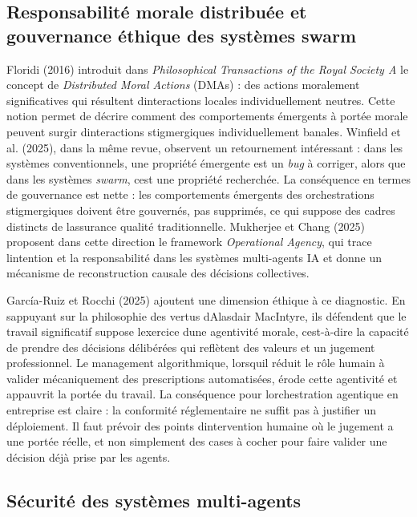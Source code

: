 \subsection{Responsabilit\'e morale distribu\'ee et gouvernance \'ethique des syst\`emes swarm}

Floridi (2016) introduit dans \emph{Philosophical Transactions of the
Royal Society A} le concept de \emph{Distributed Moral Actions} (DMAs) :
des actions moralement significatives qui résultent
d\textquotesingle interactions locales individuellement neutres. Cette
notion permet de décrire comment des comportements émergents à portée
morale peuvent surgir d\textquotesingle interactions stigmergiques
individuellement banales. Winfield et al. (2025), dans la même revue,
observent un retournement intéressant : dans les systèmes
conventionnels, une propriété émergente est un \emph{bug} à corriger,
alors que dans les systèmes \emph{swarm}, c\textquotesingle est une
propriété recherchée. La conséquence en termes de gouvernance est nette :
les comportements émergents des orchestrations stigmergiques doivent
être gouvernés, pas supprimés, ce qui suppose des cadres distincts de
l\textquotesingle assurance qualité traditionnelle. Mukherjee et Chang
(2025) proposent dans cette direction le framework
\emph{Operational Agency}, qui trace l\textquotesingle intention et la
responsabilité dans les systèmes multi-agents IA et donne un mécanisme
de reconstruction causale des décisions collectives.

García-Ruiz et Rocchi (2025) ajoutent une dimension éthique à ce
diagnostic. En s\textquotesingle appuyant sur la philosophie des vertus
d\textquotesingle Alasdair MacIntyre, ils défendent que le travail
significatif suppose l\textquotesingle exercice d\textquotesingle une
agentivité morale, c\textquotesingle est-à-dire la capacité de prendre
des décisions délibérées qui reflètent des valeurs et un jugement
professionnel. Le management algorithmique, lorsqu\textquotesingle il
réduit le rôle humain à valider mécaniquement des prescriptions
automatisées, érode cette agentivité et appauvrit la portée du travail.
La conséquence pour l\textquotesingle orchestration agentique en
entreprise est claire : la conformité réglementaire ne suffit pas à
justifier un déploiement. Il faut prévoir des points
d\textquotesingle intervention humaine où le jugement a une portée
réelle, et non simplement des cases à cocher pour faire valider une
décision déjà prise par les agents.

\subsection{S\'ecurit\'e des syst\`emes multi-agents}

